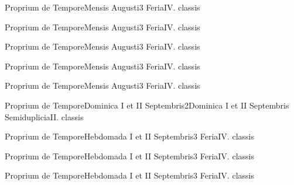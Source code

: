 \documentclass[liber-responsorialis_temporale.tex]{subfiles}
\begin{document}
	{Proprium de Tempore}{Mensis Augusti}{3}{}
	{Feria}{IV. classis}{}
	{}
	{}
\vspace{2\baselineskip}
\pagebreak

	{Proprium de Tempore}{Mensis Augusti}{3}{}
	{Feria}{IV. classis}{}
	{}
	{}

	{Proprium de Tempore}{Mensis Augusti}{3}{}
	{Feria}{IV. classis}{}
	{}
	{}

	{Proprium de Tempore}{Mensis Augusti}{3}{}
	{Feria}{IV. classis}{}
	{}
	{}

	{Proprium de Tempore}{Mensis Augusti}{3}{}
	{Feria}{IV. classis}{}
	{}
	{}

\newpage

\sixlinesvspace
{}
	{Proprium de Tempore}{Dominica I et II Septembris}{2}{Dominica I et II Septembris}
	{Semiduplicia}{II. classis}{}
	{}
	{}
\thispagestyle{empty}
\sixlinesvspace
{}
\pagebreak
\fiveplustitlevspace
\fiveplustitlevspace
{}
\sixlinesvspace
{}

\vspace{2\baselineskip}
\pagebreak

	{Proprium de Tempore}{Hebdomada I et II Septembris}{3}{}
	{Feria}{IV. classis}{}
	{}
	{}
\vspace{\baselineskip}

	{Proprium de Tempore}{Hebdomada I et II Septembris}{3}{}
	{Feria}{IV. classis}{}
	{}
	{}

	{Proprium de Tempore}{Hebdomada I et II Septembris}{3}{}
	{Feria}{IV. classis}{}
	{}
	{}
\end{document}
